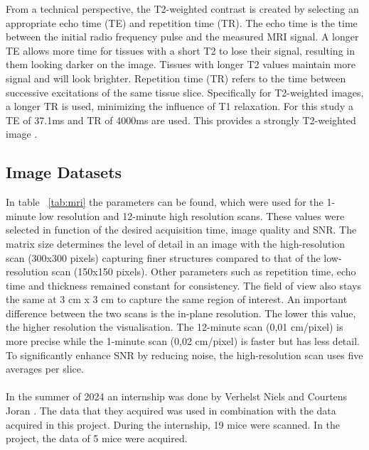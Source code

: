 \documentclass[twocolumn]{article}
\begin{document}
From a technical perspective, the T2-weighted contrast is created by selecting an appropriate echo time (TE) and repetition time (TR). 
The echo time is the time between the initial radio frequency pulse and the measured MRI signal. 
A longer TE allows more time for tissues with a short T2 to lose their signal, resulting in them looking darker on the image. 
Tissues with longer T2 values maintain more signal and will look brighter. Repetition time (TR) refers to the time between successive excitations of the same tissue slice. 
Specifically for T2-weighted images, a longer TR is used, minimizing the influence of T1 relaxation. For this study a TE of 37.1ms and TR of 4000ms are used. 
This provides a strongly T2-weighted image \cite{mrimaster2024} \cite{chavhan2009t2star}.  


\subsection{Image Datasets}

In table ~\ref{tab:mri} the parameters can be found, which were used for the 1-minute low resolution and 12-minute high resolution scans. 
These values were selected in function of the desired acquisition time, image quality and SNR. 
The matrix size determines the level of detail in an image with the high-resolution scan (300x300 pixels) capturing finer structures compared to that of the low-resolution scan (150x150 pixels). 
Other parameters such as repetition time, echo time and thickness remained constant for consistency. The field of view also stays the same at 3 cm x 3 cm to capture the same region of interest. 
An important difference between the two scans is the in-plane resolution. The lower this value, the higher resolution the visualisation. 
The 12-minute scan (0,01 cm/pixel) is more precise while the 1-minute scan (0,02 cm/pixel) is faster but has less detail. 
To significantly enhance SNR by reducing noise, the high-resolution scan uses five averages per slice.\\
\\
In the summer of 2024 an internship was done by Verhelst Niels and Courtens Joran \cite{verhelst2025denoising}. 
The data that they acquired was used in combination with the data acquired in this project. During the internship, 19 mice were scanned. 
In the project, the data of 5 mice were acquired.
 
\end{document}
